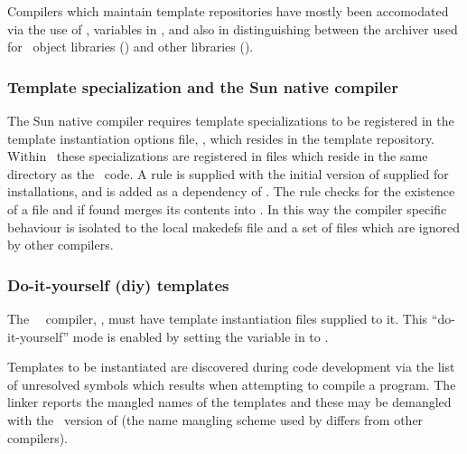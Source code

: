 
Compilers which maintain template repositories have mostly been accomodated
via the use of ,  variables in ,
and also in distinguishing between the archiver used for \cplusplus\ object
libraries () and other libraries ().

\subsubsection*{Template specialization and the Sun native compiler}


The Sun native compiler requires template specializations to be registered in
the template instantiation options file, , which resides in
the template repository.  Within \aipspp\ these specializations are registered
in  files which reside in the same directory as the
\cplusplus\ code.  A  rule is supplied with the initial
version of  supplied for  installations, and
 is added as a dependency of .  The
 rule checks for the existence of a 
file and if found merges its contents into .  In this way
the compiler specific behaviour is isolated to the local makedefs file and a
set of  files which are ignored by other compilers.

\subsubsection*{Do-it-yourself (diy) templates}



The \gnu\ \cplusplus\ compiler, , must have template
instantiation files supplied to it.  This ``do-it-yourself'' mode is enabled
by setting the  variable in  to .

Templates to be instantiated are discovered during code development via the
list of unresolved symbols which results when attempting to compile a program.
The linker reports the mangled names of the templates and these may be
demangled with the \gnu\ version of  (the name mangling
scheme used by  differs from other compilers).

